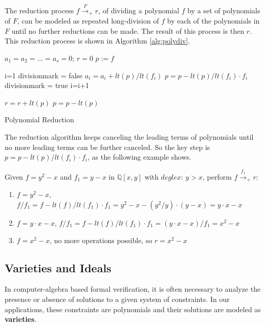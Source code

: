 The reduction process $f\stackrel{F}{\textstyle\longrightarrow}_+r$, of 
dividing a polynomial $f$ by a set of polynomials of $F$, can be modeled as
repeated long-division of $f$ by each of the polynomials in $F$ until no
further reductions can be made. The result of this process is then $r$.
This reduction process is shown in Algorithm \ref{alg:polydiv}.

\begin{algorithm}[H]
\SetAlgoNoLine

 
 $a_{1}=a_{2}=\dots=a_{s}=0$; $r=0$\;
 $p:=f$\;
 
 {
	i=1\;
	divisionmark = false\;
	{
		{
			$a_{i}=a_{i}+lt(p)/lt(f_{i})$\;
			$p=p-lt(p)/lt(f_{i}) \cdot f_{i}$\;
			divisionmark = true\;
		}
		{
			i=i+1\;
		}
	}
	
	{
		$r=r+lt(p)$\;
		$p=p-lt(p)$\;
	}

 }
\caption{Polynomial Reduction}\label{alg:polydiv}
\end{algorithm}

The reduction algorithm keeps canceling the leading terms of polynomials 
until no more leading terms can be further canceled.
So the key step is $p=p-lt(p)/lt(f_{i}) \cdot f_{i}$, as the following 
example shows.
\begin{Example}
Given $f = y^{2}-x$ and $f_{1} = y - x$ in $\mathbb{Q}[x,y]$ with $deglex$: 
$y>x$, perform $f\stackrel{f_1}{\textstyle\longrightarrow}_+r$:

\begin{enumerate}
\item $f=y^{2}-x$, $f/f_{1}=f-lt(f)/lt(f_{1}) \cdot f_{1}=y^{2}-x-(y^{2} /y) \cdot (y-x)=y\cdot x-x$
\item $f=y\cdot x-x$, $f/f_{1}=f-lt(f)/lt(f_{1}) \cdot f_{1}=(y\cdot x-x)/f_{1}=x^{2}-x$
\item $f=x^{2}-x$, no more operations possible, so $r=x^{2}-x$
\end{enumerate}
\end{Example}

\subsection{Varieties and Ideals}
In computer-algebra based formal verification,
it is often necessary to analyze the presence 
or absence of solutions to a given system of constraints.
In our applications, these constraints are polynomials and their solutions 
are modeled as {\bf varieties}.

